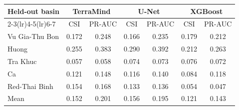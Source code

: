 \begin{tabular}{lcccccc}
\toprule
Held-out basin & \multicolumn{2}{c}{TerraMind} & \multicolumn{2}{c}{U-Net} & \multicolumn{2}{c}{XGBoost} \\
\cmidrule(lr){2-3}\cmidrule(lr){4-5}\cmidrule(lr){6-7}
 & CSI & PR-AUC & CSI & PR-AUC & CSI & PR-AUC \\
\midrule
Vu Gia-Thu Bon
& 0.172%
& 0.248%
& 0.166%
& 0.235%
& 0.179%
& 0.212%
\\
Huong
& 0.255%
& 0.383%
& 0.290%
& 0.392%
& 0.212%
& 0.263%
\\
Tra Khuc
& 0.057%
& 0.058%
& 0.074%
& 0.073%
& 0.076%
& 0.072%
\\
Ca
& 0.121%
& 0.148%
& 0.116%
& 0.140%
& 0.084%
& 0.118%
\\
Red-Thai Binh
& 0.154%
& 0.168%
& 0.133%
& 0.136%
& 0.054%
& 0.047%
\\
\midrule
Mean
& 0.152%
& 0.201%
& 0.156%
& 0.195%
& 0.121%
& 0.143%
\\
\bottomrule
\end{tabular}
